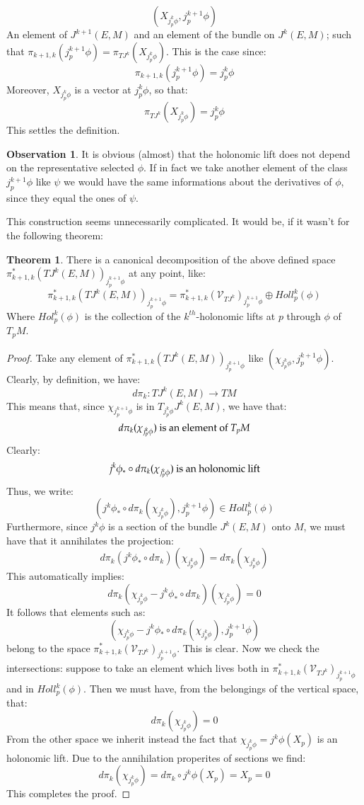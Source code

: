 \documentclass[12pt,a4paper]{report}
\theoremstyle{definition}
\theoremstyle{Theorem}
\newtheorem{Theo}[Def]{Theorem}
\theoremstyle{break}
\theoremstyle{definition}
\newtheorem{Obs}[Def]{Observation}
\begin{document}
		$$(X_{j^k_p\phi},j^{k+1}_p\phi)$$
		An element of $J^{k+1}(E,M)$ and an element of the bundle on $J^k(E,M)$; such that $\pi_{k+1,k}(j^{k+1}_p\phi)=\pi_{TJ^k}(X_{j^k_p\phi})$. This is the case since:
		$$\pi_{k+1,k}(j^{k+1}_p\phi)=j^k_p\phi$$
		Moreover, $X_{j^k_p\phi}$ is a vector at $j^k_p\phi$, so that:
		$$\pi_{TJ^k}(X_{j^k_p\phi})=j^k_p\phi$$
		This settles the definition.
		\begin{Obs}
			It is obvious (almost) that the holonomic lift does not depend on the representative selected $\phi$. If in fact we take another element of the class $j^{k+1}_p\phi$ like $\psi$ we would have the same informations about the derivatives of $\phi$, since they equal the ones of $\psi$.
		\end{Obs}
		This construction seems unnecessarily complicated. It would be, if it wasn't for the following theorem:
		\begin{Theo}
			There is a canonical decomposition of the above defined space $\pi_{k+1,k}^*(TJ^k(E,M))_{j^{k+1}_p\phi}$ at any point, like:
			$$\pi_{k+1,k}^*(TJ^k(E,M))_{j^{k+1}_p\phi}=\pi_{k+1,k}^*(\mathcal{V}_{TJ^k})_{j^{k+1}_p\phi}\oplus Holl_p^k(\phi)$$
			Where $Hol_p^k(\phi)$ is the collection of the $k^{th}$-holonomic lifts at $p$ through $\phi$ of $T_pM$.
		\end{Theo}
		\begin{proof}
			Take any element of $\pi_{k+1,k}^*(TJ^k(E,M))_{j^{k+1}_p\phi}$ like $(\chi_{j^{k}_p\phi},j^{k+1}_p\phi)$. Clearly, by definition, we have:
			$$d\pi_k:TJ^k(E,M)\rightarrow TM$$
			This means that, since $\chi_{j^{k+1}_p\phi}$ is in $T_{j^k_p\phi}J^k(E,M)$, we have that:
			$$d\pi_k(\chi_{j^{k}_p\phi}) \hbox{ is an element of }T_pM$$
			Clearly:
			$$j^k\phi_*\circ d\pi_k(\chi_{j^{k}_p\phi})\hbox{ is an holonomic lift}$$
			Thus, we write:
			$$(j^k\phi_*\circ d\pi_k(\chi_{j^{k}_p\phi}),j^{k+1}_p\phi)\in Holl_p^k(\phi)$$
			Furthermore, since $j^k\phi$ is a section of the bundle $J^k(E,M)$ onto $M$, we must have that it annihilates the projection:
			$$d\pi_k(j^k\phi_*\circ d\pi_k)(\chi_{j^{k}_p\phi})=d\pi_k(\chi_{j^{k}_p\phi})$$
			This automatically implies:
			$$d\pi_k(\chi_{j^{k}_p\phi}-j^k\phi_*\circ d\pi_k)(\chi_{j^{k}_p\phi})=0$$
			It follows that elements such as:
			$$(\chi_{j^{k}_p\phi}-j^k\phi_*\circ d\pi_k(\chi_{j^{k}_p\phi}),j^{k+1}_p\phi)$$
			belong to the space $\pi_{k+1,k}^*(\mathcal{V}_{TJ^k})_{j^{k+1}_p\phi}$. This is clear. Now we check the intersections: suppose to take an element which lives both in $\pi_{k+1,k}^*(\mathcal{V}_{TJ^k})_{j^{k+1}_p\phi}$ and in $Holl_p^k(\phi)$. Then we must have, from the belongings of the vertical space, that:
			$$d\pi_k(\chi_{j^{k}_p\phi})=0$$
			From the other space we inherit instead the fact that $\chi_{j^{k}_p\phi}=j^k\phi(X_p)$ is an holonomic lift. Due to the annihilation properites of sections we find:
			$$d\pi_k( \chi_{j^{k}_p\phi})=d\pi_k\circ j^k\phi(X_p)=X_p=0$$
			This completes the proof.
		\end{proof}
\end{document}

